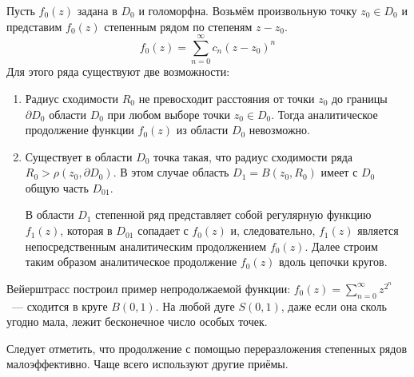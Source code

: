 \documentclass[a4paper, 12pt]{report}
\begin{document}
Пусть $f_0(z)$ задана в $D_0$ и голоморфна. Возьмём произвольную точку $z_0 \in D_0$ и представим $f_0(z)$ степенным рядом по степеням $z-z_0$.
\[f_0(z) = \sum_{n=0}^\infty c_n(z-z_0)^n\]
Для этого ряда существуют две возможности:
\begin{enumerate}
    \item Радиус сходимости $R_0$ не превосходит расстояния от точки $z_0$ до границы $\partial D_0$ области $D_0$ при любом выборе точки $z_0 \in D_0$.
    Тогда аналитическое продолжение функции $f_0(z)$ из области $D_0$ невозможно.

    \item Существует в области $D_0$ точка такая, что радиус сходимости ряда $R_0 > \rho(z_0, \partial D_0)$. В этом случае область $D_1 = B(z_0, R_0)$ имеет с $D_0$ общую часть $D_{01}$. \\
    \begin{center}
    \end{center}
    В области $D_1$ степенной ряд представляет собой регулярную функцию $f_1(z)$, которая в $D_{01}$ сопадает с $f_0(z)$ и, следовательно, $f_1(z)$ является непосредственным аналитическим продолжением $f_0(z)$.
    Далее строим таким образом аналитическое продолжение $f_0(z)$ вдоль цепочки кругов.
\end{enumerate}
Вейерштрасс построил пример непродолжаемой функции: $\displaystyle f_0(z) = \sum_{n=0}^\infty z^{2^n}$~--- сходится в круге $B(0,1)$.
На любой дуге $S(0,1)$, даже если она сколь угодно мала, лежит бесконечное число особых точек.

Следует отметить, что продолжение с помощью переразложения степенных рядов малоэффективно. Чаще всего используют другие приёмы.
\end{document}
